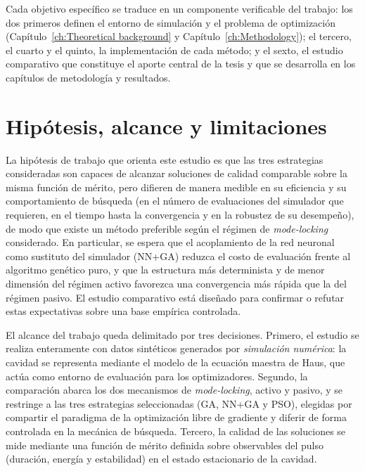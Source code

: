 Cada objetivo específico se traduce en un componente verificable del trabajo: los dos primeros definen el entorno de simulación y el problema de optimización (Capítulo~\ref{ch:Theoretical background} y Capítulo~\ref{ch:Methodology}); el tercero, el cuarto y el quinto, la implementación de cada método; y el sexto, el estudio comparativo que constituye el aporte central de la tesis y que se desarrolla en los capítulos de metodología y resultados.

 
\section{Hipótesis, alcance y limitaciones}
\label{sec:hipotesis-alcance}
 
La hipótesis de trabajo que orienta este estudio es que las tres estrategias consideradas son capaces de alcanzar soluciones de calidad comparable sobre la misma función de mérito, pero difieren de manera medible en su eficiencia y su comportamiento de búsqueda (en el número de evaluaciones del simulador que requieren, en el tiempo hasta la convergencia y en la robustez de su desempeño), de modo que existe un método preferible según el régimen de \emph{mode-locking} considerado. En particular, se espera que el acoplamiento de la red neuronal como sustituto del simulador (NN+GA) reduzca el costo de evaluación frente al algoritmo genético puro, y que la estructura más determinista y de menor dimensión del régimen activo favorezca una convergencia más rápida que la del régimen pasivo. El estudio comparativo está diseñado para confirmar o refutar estas expectativas sobre una base empírica controlada.
 
El alcance del trabajo queda delimitado por tres decisiones. Primero, el estudio se realiza enteramente con datos sintéticos generados por \emph{simulación numérica}: la cavidad se representa mediante el modelo de la ecuación maestra de Haus, que actúa como entorno de evaluación para los optimizadores. Segundo, la comparación abarca los dos mecanismos de \emph{mode-locking}, activo y pasivo, y se restringe a las tres estrategias seleccionadas (GA, NN+GA y PSO), elegidas por compartir el paradigma de la optimización libre de gradiente y diferir de forma controlada en la mecánica de búsqueda. Tercero, la calidad de las soluciones se mide mediante una función de mérito definida sobre observables del pulso (duración, energía y estabilidad) en el estado estacionario de la cavidad.
 
